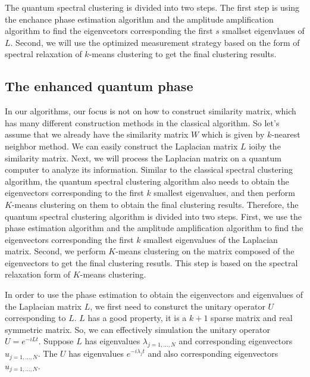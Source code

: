 \documentclass[onecolumn,notitlepage]{revtex4-1}
\begin{document}
The quantum spectral clustering is divided into two steps. The first step is using the enchance phase estimation algorithm and the amplitude amplification algorithm to find the eigenvcetors corresponding the first $s$ smallset eigenvlaues of $L$. Second, we will use the optimized measurement strategy based on the form of spectral relaxation of $k$-means clustering to get the final clustering results.



\subsection{The enhanced quantum phase}
In our algorithms, our focus is not on how to construct similarity matrix, which has many different construction methods in the classical algorithm. 
So let's assume that we already have the similarity matrix $W$ which is given by $k$-nearest neighbor method.
We can easily construct the Laplacian matrix $L$ ioiby the similarity matrix. 
Next, we will process the Laplacian matrix on a quantum computer to analyze its information. 
Similar to the classical spectral clustering algorithm, the quantum spectral clustering algorithm also needs to obtain the eigenvectors corresponding to the first $k$ smallest eigenvalues, and then perform $K$-means clustering on them to obtain the final clustering results. 
Therefore, the quantum spectral clustering algorithm is divided into two steps. 
First, we use the phase estimation algorithm and the amplitude amplification algorithm to find the eigenvectors corresponding the first $k$ smallest eigenvalues of the Laplacian matrix. 
Second, we perform $K$-means clustering on the matrix composed of the eigenvectors to get the final clustering resutls. 
This step is based on the spectral relaxation form of $K$-means clustering.

In order to use the phase estimation to obtain the eigenvectors and eigenvalues of the Laplacian matrix $L$, we first need to consturct the unitary operator $U$ corresponding to $L$. 
$L$ has a good property, it is a $k+1$ sparse matrix and real symmetric matrix. 
So, we can effectively simulation the unitary operator $U=e^{-iLt}$. Suppose $L$ has eigenvalues $\lambda_{j=1,...,N}$ and corresponding eigenvectors $u_{j=1,...,N}$. 
The $U$ has eigenvalues $e^{-i\lambda_{j}t}$ and also corresponding eigenvectors $u_{j=1,...,N}$.
\end{document}
